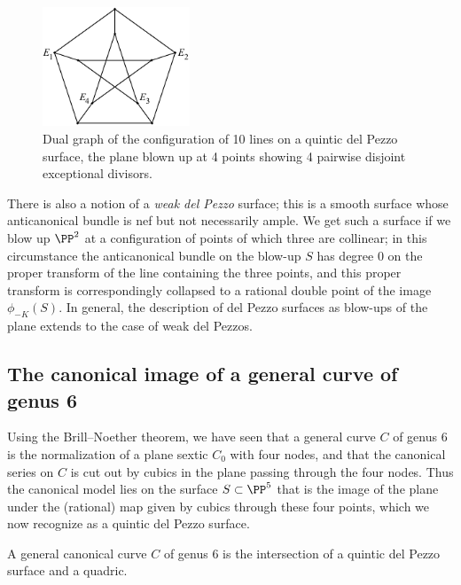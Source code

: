 \begin{figure}
\centerline {\includegraphics[height=1.4in]{main/Fig11-5}}
\caption{Dual graph of the configuration of 10 lines on a quintic del
Pezzo surface, the plane blown up
at 4 points showing 4 pairwise disjoint exceptional divisors.}
\label{dual graph of the configuration of 10 lines on a quintic del
Pezzo surface}
\end{figure}

There is also a notion of a \emph{weak del Pezzo}
%
surface; this is a
smooth surface whose
anticanonical bundle
%
 is
nef but not necessarily ample.
%
We get such a surface if we blow up $\PP^2$ at a configuration
of points of which three are collinear; in this circumstance the
anticanonical bundle on the blow-up $S$ has degree 0 on the proper
transform of the line containing the three points, and this proper
transform is correspondingly collapsed to a rational double point of the
image $\phi_{-K}(S)$. In general, the description of del Pezzo surfaces
as blow-ups of the plane extends to the case of weak del Pezzos.



\subsection{The canonical image of a general curve of genus 6}

Using the Brill--Noether theorem, we have seen that a general curve $C$
of genus 6 is the normalization of a plane sextic $C_0$ with four nodes,
and that the canonical series on $C$ is cut out by cubics in the plane
passing through the four nodes. Thus the canonical model lies on the
surface $S \subset \PP^5$ that is the image of the plane under the
(rational) map given by cubics through these four points, which we now
recognize as a quintic del Pezzo surface.

\begin{theorem}
A general canonical curve $C$ of genus 6 is the intersection of a quintic
del Pezzo surface and a quadric.
\end{theorem}

